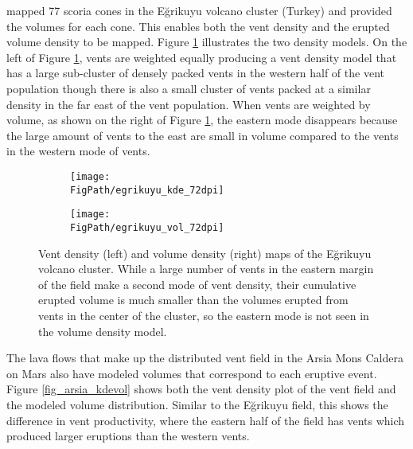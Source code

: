 \citet{uslular2015size} mapped 77 scoria cones in the E\u{g}rikuyu volcano cluster (Turkey) and provided the volumes for each cone. This enables both the vent density and the erupted volume density to be mapped. Figure \ref{fig_egrikuyu_kdevol} illustrates the two density models. On the left of Figure \ref{fig_egrikuyu_kdevol}, vents are weighted equally producing a vent density model that has a large sub-cluster of densely packed vents in the western half of the vent population though there is also a small cluster of vents packed at a similar density in the far east of the vent population. When vents are weighted by volume, as shown on the right of Figure \ref{fig_egrikuyu_kdevol}, the eastern mode disappears because the large amount of vents to the east are small in volume compared to the vents in the western mode of vents.

\begin{figure}[h!]
    \centering
    \begin{subfigure}{0.49\textwidth}
        \centering
        \texttt{[image: \\FigPath/egrikuyu\_kde\_72dpi]}
    \end{subfigure}
    \begin{subfigure}{0.49\textwidth}
        \centering
        \texttt{[image: \\FigPath/egrikuyu\_vol\_72dpi]}
    \end{subfigure}
    \caption[Vent density and volume density maps of the E\u{g}rikuyu volcano cluster]{Vent density (left) and volume density (right) maps of the E\u{g}rikuyu volcano cluster. While a large number of vents in the eastern margin of the field make a second mode of vent density, their cumulative erupted volume is much smaller than the volumes erupted from vents in the center of the cluster, so the eastern mode is not seen in the volume density model.}
\label{fig_egrikuyu_kdevol}
\end{figure}

The lava flows that make up the distributed vent field in the Arsia Mons Caldera on Mars also have modeled volumes that correspond to each eruptive event. Figure \ref{fig_arsia_kdevol} shows both the vent density plot of the vent field and the modeled volume distribution. Similar to the E\u{g}rikuyu field, this shows the difference in vent productivity, where the eastern half of the field has vents which produced larger eruptions than the western vents.

